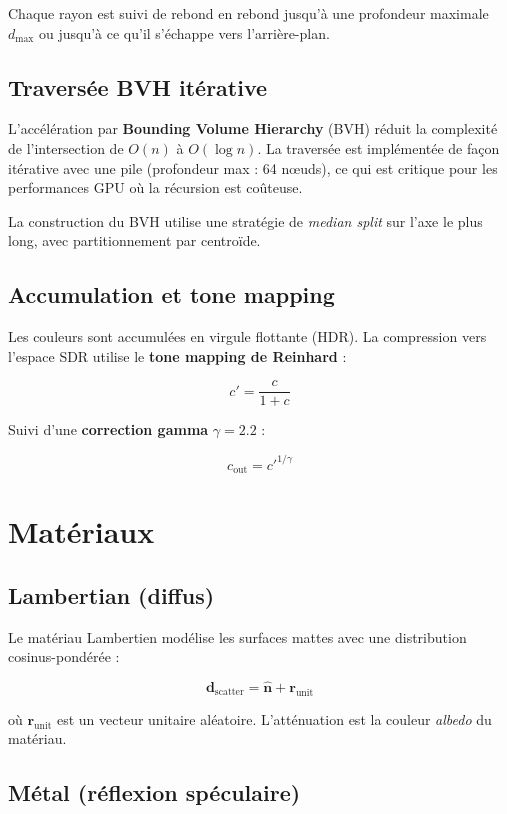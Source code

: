 \documentclass[12pt,a4paper]{article}
\begin{document}
Chaque rayon est suivi de rebond en rebond jusqu'à une profondeur maximale $d_{\max}$
ou jusqu'à ce qu'il s'échappe vers l'arrière-plan.

\subsection{Traversée BVH itérative}

L'accélération par \textbf{Bounding Volume Hierarchy} (BVH) réduit la complexité
de l'intersection de $O(n)$ à $O(\log n)$. La traversée est implémentée de façon
itérative avec une pile (profondeur max : 64 nœuds), ce qui est critique pour
les performances GPU où la récursion est coûteuse.

La construction du BVH utilise une stratégie de \textit{median split} sur l'axe
le plus long, avec partitionnement par centroïde.

\subsection{Accumulation et tone mapping}

Les couleurs sont accumulées en virgule flottante (HDR). La compression vers
l'espace SDR utilise le \textbf{tone mapping de Reinhard} :

\[
c' = \frac{c}{1 + c}
\]

Suivi d'une \textbf{correction gamma} $\gamma = 2.2$ :

\[
c_{\text{out}} = c'^{1/\gamma}
\]

\section{Matériaux}

\subsection{Lambertian (diffus)}

Le matériau Lambertien modélise les surfaces mattes avec une distribution
cosinus-pondérée :

\[
\bm{d}_{\text{scatter}} = \hat{\bm{n}} + \bm{r}_{\text{unit}}
\]

où $\bm{r}_{\text{unit}}$ est un vecteur unitaire aléatoire. L'atténuation est
la couleur \textit{albedo} du matériau.

\subsection{Métal (réflexion spéculaire)}
\end{document}
